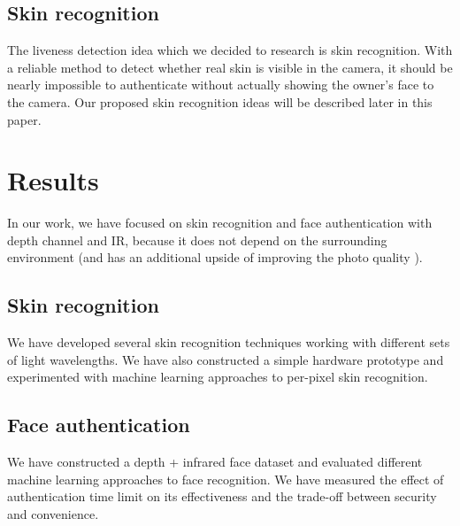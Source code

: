         \subsection*{Skin recognition}
            The liveness detection idea which we decided to research is skin recognition.
            With a reliable method to detect whether real skin is visible in the camera,
            it should be nearly impossible to authenticate without actually showing
            the owner's face to the camera.
            Our proposed skin recognition ideas will be described later in this paper.

    \section{Results}
        In our work, we have focused on skin recognition and face authentication
        with depth channel and IR, because it does not depend on the surrounding environment
        (and has an additional upside of improving the photo quality \cite{niienphoto}).

        \subsection*{Skin recognition}
            We have developed several skin recognition techniques working with different
            sets of light wavelengths. We have also constructed a simple hardware prototype
            and experimented with machine learning approaches to per-pixel skin recognition.

        \subsection*{Face authentication}
            We have constructed a depth + infrared face dataset and evaluated different
            machine learning approaches to face recognition. We have measured the
            effect of authentication time limit on its effectiveness and the trade-off
            between security and convenience.
